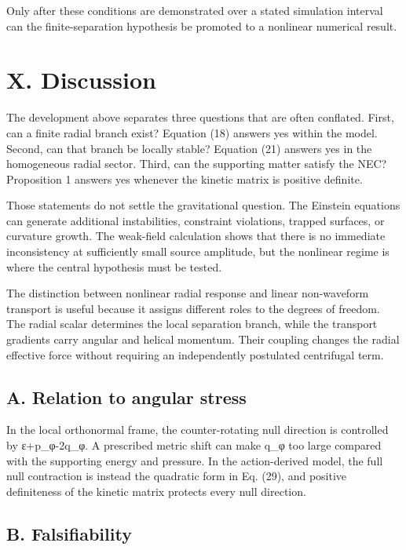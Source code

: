 Only after these conditions are demonstrated over a stated simulation
interval can the finite-separation hypothesis be promoted to a nonlinear
numerical result.

\section{X. Discussion}\label{x.-discussion}

The development above separates three questions that are often
conflated. First, can a finite radial branch exist? Equation (18)
answers yes within the model. Second, can that branch be locally stable?
Equation (21) answers yes in the homogeneous radial sector. Third, can
the supporting matter satisfy the NEC? Proposition 1 answers yes
whenever the kinetic matrix is positive definite.

Those statements do not settle the gravitational question. The Einstein
equations can generate additional instabilities, constraint violations,
trapped surfaces, or curvature growth. The weak-field calculation shows
that there is no immediate inconsistency at sufficiently small source
amplitude, but the nonlinear regime is where the central hypothesis must
be tested.

The distinction between nonlinear radial response and linear
non-waveform transport is useful because it assigns different roles to
the degrees of freedom. The radial scalar determines the local
separation branch, while the transport gradients carry angular and
helical momentum. Their coupling changes the radial effective force
without requiring an independently postulated centrifugal term.

\subsection{A. Relation to angular
stress}\label{a.-relation-to-angular-stress}

In the local orthonormal frame, the counter-rotating null direction is
controlled by ε+p\_φ-2q\_φ. A prescribed metric shift can make q\_φ too
large compared with the supporting energy and pressure. In the
action-derived model, the full null contraction is instead the quadratic
form in Eq. (29), and positive definiteness of the kinetic matrix
protects every null direction.

\subsection{B. Falsifiability}\label{b.-falsifiability}

